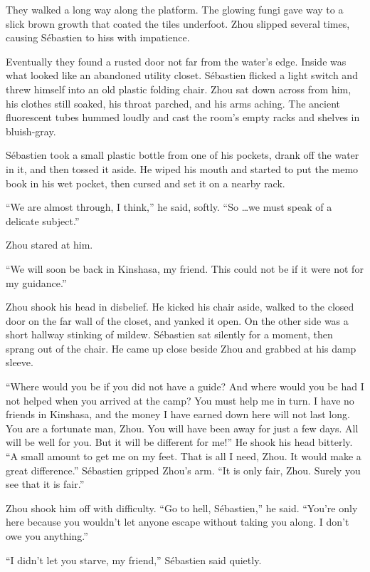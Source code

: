\documentclass[10pt,b5paper]{article}
\begin{document}
They walked a long way along the platform. The glowing fungi gave
way to a slick brown growth that coated the tiles underfoot. Zhou
slipped several times, causing S\'{e}bastien to hiss with impatience.

Eventually they found a rusted door not far from the water's
edge. Inside was what looked like an abandoned utility
closet. S\'{e}bastien flicked a light switch and threw himself into
an old plastic folding chair. Zhou sat down across from him, his
clothes still soaked, his throat parched, and his arms aching.
The ancient fluorescent tubes hummed loudly and cast the room's
empty racks and shelves in bluish-gray.

S\'{e}bastien took a small plastic bottle from one of his pockets,
drank off the water in it, and then tossed it aside. He wiped his
mouth and started to put the memo book in his wet pocket, then
cursed and set it on a nearby rack.

``We are almost through, I think,'' he said, softly. ``So \ldots we must
speak of a delicate subject.''

Zhou stared at him.

``We will soon be back in Kinshasa, my friend. This could not be if
it were not for my guidance.''

Zhou shook his head in disbelief. He kicked his chair aside, walked
to the closed door on the far wall of the closet, and yanked it
open. On the other side was a short hallway stinking of mildew.
S\'{e}bastien sat silently for a moment, then sprang out of the chair.
He came up close beside Zhou and grabbed at his damp sleeve.

``Where would you be if you did not have a guide? And where would
you be had I not helped when you arrived at the camp? You must help
me in turn. I have no friends in Kinshasa, and the money I have
earned down here will not last long. You are a fortunate man, Zhou.
You will have been away for just a few days. All will be well for
you. But it will be different for me!'' He shook his head bitterly. ``A
small amount to get me on my feet. That is all I need, Zhou. It
would make a great difference.'' S\'{e}bastien gripped Zhou's arm.
``It is only fair, Zhou. Surely you see that it is fair.''

Zhou shook him off with difficulty. ``Go to hell, S\'{e}bastien,'' he said.
``You're only here because you wouldn't let anyone escape without
taking you along. I don't owe you anything.''

``I didn't let you starve, my friend,'' S\'{e}bastien said quietly.
\end{document}
